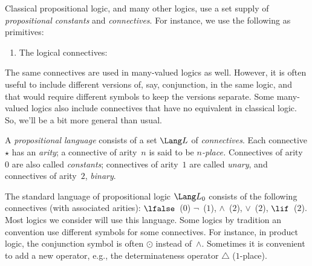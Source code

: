 \documentclass[../../../include/open-logic-section]{subfiles}
\begin{document}


Classical propositional logic, and many other logics, use a set supply
of \emph{propositional constants} and \emph{connectives}. For
instance, we use the following as primitives:
\begin{enumerate}
\item The logical connectives:
  \startycommalist
\end{enumerate}

The same connectives are used in many-valued logics as well. However,
it is often useful to include different versions of, say, conjunction,
in the same logic, and that would require different symbols to keep
the versions separate. Some many-valued logics also include
connectives that have no equivalent in classical logic. So, we'll be a
bit more general than usual.

\begin{defn}
  A \emph{propositional language} consists of a set $\Lang L$ of
  \emph{connectives}. Each connective $\star$ has an \emph{arity}; a
  connective of arity~$n$ is said to be \emph{$n$-place.}
  Connectives of arity~$0$ are also called \emph{constants};
  connectives of arity~$1$ are called \emph{unary}, and connectives of
  arity~$2$, \emph{binary}.
\end{defn}

\begin{ex}
  The standard language of propositional logic $\Lang L_0$ consists of
  the following connectives (with associated arities): 
  $\lfalse$~($0$)
  $\lnot$~($1$),
  $\land$~($2$),
  $\lor$~($2$),
  $\lif$~($2$). Most logics we consider will use this language. Some
  logics by tradition an convention use different symbols for some
  connectives. For instance, in product logic, the conjunction symbol
  is often $\odot$ instead of~$\land$. Sometimes it is convenient to
  add a new operator, e.g., the determinateness operator $\triangle$
  ($1$-place).
\end{ex}
\end{document}
